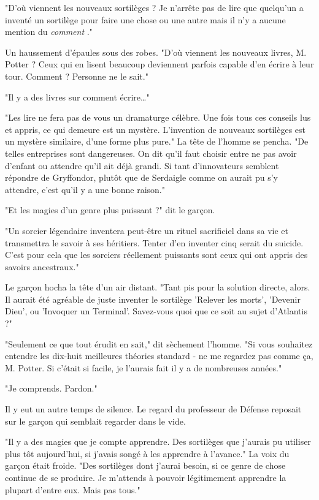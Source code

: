 "D'où viennent les nouveaux sortilèges ? Je n'arrête pas de lire que quelqu'un a inventé un sortilège pour faire une chose ou une autre mais il n'y a aucune mention du \emph{comment} ."

Un haussement d'épaules sous des robes. "D'où viennent les nouveaux livres, M. Potter ? Ceux qui en lisent beaucoup deviennent parfois capable d'en écrire à leur tour. Comment ? Personne ne le sait."

"Il y a des livres sur comment écrire…"

"Les lire ne fera pas de vous un dramaturge célèbre. Une fois tous ces conseils lus et appris, ce qui demeure est un mystère. L'invention de nouveaux sortilèges est un mystère similaire, d'une forme plus pure." La tête de l'homme se pencha. "De telles entreprises sont dangereuses. On dit qu'il faut choisir entre ne pas avoir d'enfant ou attendre qu'il ait déjà grandi. Si tant d'innovateurs semblent répondre de Gryffondor, plutôt que de Serdaigle comme on aurait pu s'y attendre, c'est qu'il y a une bonne raison."

"Et les magies d'un genre plus puissant ?" dit le garçon.

"Un sorcier légendaire inventera peut-être un rituel sacrificiel dans sa vie et transmettra le savoir à ses héritiers. Tenter d'en inventer cinq serait du suicide. C'est pour cela que les sorciers réellement puissants sont ceux qui ont appris des savoirs ancestraux."

Le garçon hocha la tête d'un air distant. "Tant pis pour la solution directe, alors. Il aurait été agréable de juste inventer le sortilège 'Relever les morts', 'Devenir Dieu', ou 'Invoquer un Terminal'. Savez-vous quoi que ce soit au sujet d'Atlantis ?"

"Seulement ce que tout érudit en sait," dit sèchement l'homme. "Si vous souhaitez entendre les dix-huit meilleures théories standard - ne me regardez pas comme ça, M. Potter. Si c'était si facile, je l'aurais fait il y a de nombreuses années."

"Je comprends. Pardon."

Il y eut un autre temps de silence. Le regard du professeur de Défense reposait sur le garçon qui semblait regarder dans le vide.

"Il y a des magies que je compte apprendre. Des sortilèges que j'aurais pu utiliser plus tôt aujourd'hui, si j'avais songé à les apprendre à l'avance." La voix du garçon était froide. "Des sortilèges dont j'aurai besoin, si ce genre de chose continue de se produire. Je m'attends à pouvoir légitimement apprendre la plupart d'entre eux. Mais pas tous."

